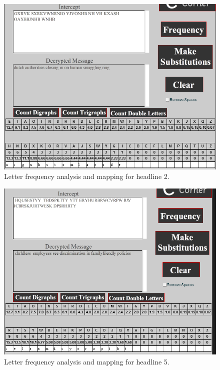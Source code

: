 \documentclass[12pt,a4paper,onecolumn]{article}
\begin{document}
	\begin{figure}[h]
		\center
		\includegraphics[scale=0.7]{cw_files/question_4/q2/Q2_sol.png}
		\caption{Letter frequency analysis and mapping for headline 2.}
	\end{figure}
	
	\begin{figure}[h]
		\center
		\includegraphics[scale=0.7]{cw_files/question_4/q5/puzzle_5.png}
		\caption{Letter frequency analysis and mapping for headline 5.}
	\end{figure}
\end{document}
